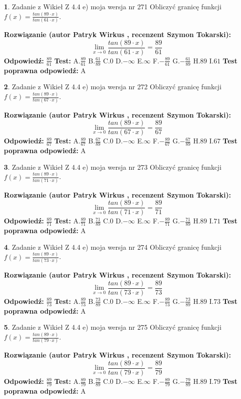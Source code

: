 \documentclass[12pt, a4paper]{article}
\theoremstyle{definition} %
\newtheorem{zad}{}
\newcommand{\zadStart}[1]{\begin{zad}#1\newline}
\newcommand{\zadStop}{\end{zad}}
\newcommand{\rozwStart}[2]{\noindent \textbf{Rozwiązanie (autor #1 , recenzent #2): }\newline}
\newcommand{\rozwStop}{\newline}
\newcommand{\odpStart}{\noindent \textbf{Odpowiedź:}\newline}
\newcommand{\odpStop}{\newline}
\newcommand{\testStart}{\noindent \textbf{Test:}\newline}
\newcommand{\testStop}{\newline}
\newcommand{\kluczStart}{\noindent \textbf{Test poprawna odpowiedź:}\newline}
\newcommand{\kluczStop}{\newline}
\begin{document}
\zadStart{Zadanie z Wikieł Z 4.4 e) moja wersja nr 271}
Obliczyć granicę funkcji $f(x)=\frac{tan(89\cdot x)}{tan(61\cdot x)}$.
\zadStop
\rozwStart{Patryk Wirkus}{Szymon Tokarski}
$$\lim\limits_{x\to 0}\frac{tan(89\cdot x)}{tan(61\cdot x)}=
\frac{89}{61}$$
\rozwStop
\odpStart
$\frac{89}{61}$
\odpStop
\testStart
A.$\frac{89}{61}$
B.$\frac{61}{89}$
C.$0$
D.$-\infty$
E.$\infty$
F.$-\frac{89}{61}$
G.$-\frac{61}{89}$
H.$89$
I.$61$
\testStop
\kluczStart
A
\kluczStop



\zadStart{Zadanie z Wikieł Z 4.4 e) moja wersja nr 272}
Obliczyć granicę funkcji $f(x)=\frac{tan(89\cdot x)}{tan(67\cdot x)}$.
\zadStop
\rozwStart{Patryk Wirkus}{Szymon Tokarski}
$$\lim\limits_{x\to 0}\frac{tan(89\cdot x)}{tan(67\cdot x)}=
\frac{89}{67}$$
\rozwStop
\odpStart
$\frac{89}{67}$
\odpStop
\testStart
A.$\frac{89}{67}$
B.$\frac{67}{89}$
C.$0$
D.$-\infty$
E.$\infty$
F.$-\frac{89}{67}$
G.$-\frac{67}{89}$
H.$89$
I.$67$
\testStop
\kluczStart
A
\kluczStop



\zadStart{Zadanie z Wikieł Z 4.4 e) moja wersja nr 273}
Obliczyć granicę funkcji $f(x)=\frac{tan(89\cdot x)}{tan(71\cdot x)}$.
\zadStop
\rozwStart{Patryk Wirkus}{Szymon Tokarski}
$$\lim\limits_{x\to 0}\frac{tan(89\cdot x)}{tan(71\cdot x)}=
\frac{89}{71}$$
\rozwStop
\odpStart
$\frac{89}{71}$
\odpStop
\testStart
A.$\frac{89}{71}$
B.$\frac{71}{89}$
C.$0$
D.$-\infty$
E.$\infty$
F.$-\frac{89}{71}$
G.$-\frac{71}{89}$
H.$89$
I.$71$
\testStop
\kluczStart
A
\kluczStop



\zadStart{Zadanie z Wikieł Z 4.4 e) moja wersja nr 274}
Obliczyć granicę funkcji $f(x)=\frac{tan(89\cdot x)}{tan(73\cdot x)}$.
\zadStop
\rozwStart{Patryk Wirkus}{Szymon Tokarski}
$$\lim\limits_{x\to 0}\frac{tan(89\cdot x)}{tan(73\cdot x)}=
\frac{89}{73}$$
\rozwStop
\odpStart
$\frac{89}{73}$
\odpStop
\testStart
A.$\frac{89}{73}$
B.$\frac{73}{89}$
C.$0$
D.$-\infty$
E.$\infty$
F.$-\frac{89}{73}$
G.$-\frac{73}{89}$
H.$89$
I.$73$
\testStop
\kluczStart
A
\kluczStop



\zadStart{Zadanie z Wikieł Z 4.4 e) moja wersja nr 275}
Obliczyć granicę funkcji $f(x)=\frac{tan(89\cdot x)}{tan(79\cdot x)}$.
\zadStop
\rozwStart{Patryk Wirkus}{Szymon Tokarski}
$$\lim\limits_{x\to 0}\frac{tan(89\cdot x)}{tan(79\cdot x)}=
\frac{89}{79}$$
\rozwStop
\odpStart
$\frac{89}{79}$
\odpStop
\testStart
A.$\frac{89}{79}$
B.$\frac{79}{89}$
C.$0$
D.$-\infty$
E.$\infty$
F.$-\frac{89}{79}$
G.$-\frac{79}{89}$
H.$89$
I.$79$
\testStop
\kluczStart
A
\kluczStop
\end{document}
